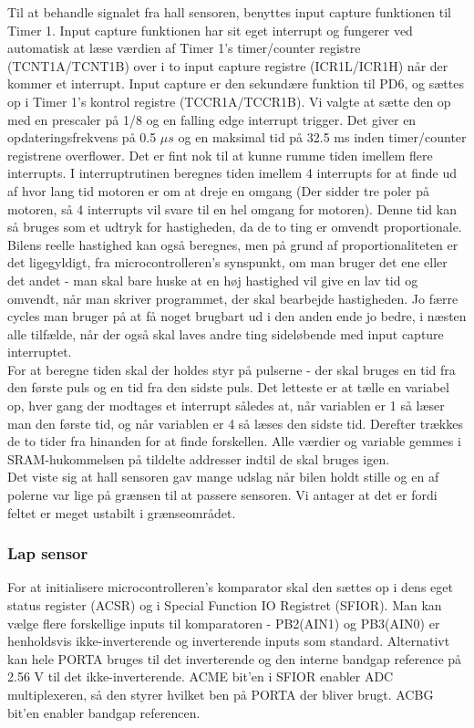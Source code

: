 Til at behandle signalet fra hall sensoren, benyttes input capture funktionen til Timer 1. Input capture funktionen har sit eget interrupt og fungerer ved automatisk at læse værdien af Timer 1's timer/counter registre (TCNT1A/TCNT1B) over i to input capture registre (ICR1L/ICR1H) når der kommer et interrupt. Input capture er den sekundære funktion til PD6, og sættes op i Timer 1's kontrol registre (TCCR1A/TCCR1B). Vi valgte at sætte den op med en prescaler på 1/8 og en falling edge interrupt trigger. Det giver en opdateringsfrekvens på 0.5 $\mu s$ og en maksimal tid på 32.5 ms inden timer/counter registrene overflower. Det er fint nok til at kunne rumme tiden imellem flere interrupts. I interruptrutinen beregnes tiden imellem 4 interrupts for at finde ud af hvor lang tid motoren er om at dreje en omgang (Der sidder tre poler på motoren, så 4 interrupts vil svare til en hel omgang for motoren). Denne tid kan så bruges som et udtryk for hastigheden, da de to ting er omvendt proportionale. Bilens reelle hastighed kan også beregnes, men på grund af proportionaliteten er det ligegyldigt, fra microcontrolleren's synspunkt, om man bruger det ene eller det andet - man skal bare huske at en høj hastighed vil give en lav tid og omvendt, når man skriver programmet, der skal bearbejde hastigheden. Jo færre cycles man bruger på at få noget brugbart ud i den anden ende jo bedre, i næsten alle tilfælde, når der også skal laves andre ting sideløbende med input capture interruptet.\\
For at beregne tiden skal der holdes styr på pulserne - der skal bruges en tid fra den første puls og en tid fra den sidste puls. Det letteste er at tælle en variabel op, hver gang der modtages et interrupt således at, når variablen er 1 så læser man den første tid, og når variablen er 4 så læses den sidste tid. Derefter trækkes de to tider fra hinanden for at finde forskellen. Alle værdier og variable gemmes i SRAM-hukommelsen på tildelte addresser indtil de skal bruges igen.\\

Det viste sig at hall sensoren gav mange udslag når bilen holdt stille og en af polerne var lige på grænsen til at passere sensoren. Vi antager at det er fordi feltet er meget ustabilt i grænseområdet. 


\subsubsection{Lap sensor}

For at initialisere microcontrolleren's komparator skal den sættes op i dens eget status register (ACSR) og i Special Function IO Registret (SFIOR). Man kan vælge flere forskellige inputs til komparatoren - PB2(AIN1) og PB3(AIN0) er henholdsvis ikke-inverterende og inverterende inputs som standard. Alternativt kan hele PORTA bruges til det inverterende og den interne bandgap reference på 2.56 V til det ikke-inverterende.  ACME bit'en i SFIOR enabler ADC multiplexeren, så den styrer hvilket ben på PORTA der bliver brugt. ACBG bit'en enabler bandgap referencen.

